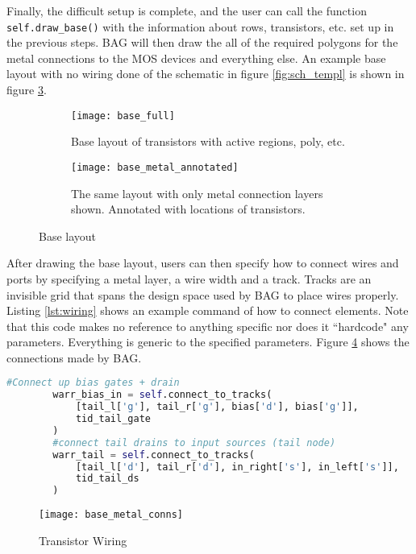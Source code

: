 \clearpage
Finally, the difficult setup is complete, and the user can call the function \texttt{self.draw\_base()} with the information about rows, transistors, etc. set up in the previous steps. BAG will then draw the all of the required polygons for the metal connections to the MOS devices and everything else. An example base layout with no wiring done of the schematic in figure \ref{fig:sch_templ} is shown in figure \ref{fig:base_layout_metal}.
\begin{figure}[h]
\centering
\begin{subfigure}{.4\linewidth}
  \centering
  \texttt{[image: base\_full]}
  \caption{Base layout of transistors with active regions, poly, etc.}
  \label{fig:sfig1}
\end{subfigure}
\begin{subfigure}{.4\linewidth}
  \centering
\texttt{[image: base\_metal\_annotated]}
  \caption{The same layout with only metal connection layers shown. Annotated with locations of transistors.}
  \label{fig:sfig2}
\end{subfigure}
\caption{Base layout}
\label{fig:base_layout_metal}
\end{figure}
\clearpage
After drawing the base layout, users can then specify how to connect wires and ports by specifying a metal layer, a wire width and a track. Tracks are an invisible grid that spans the design space used by BAG to place wires properly. Listing \ref{lst:wiring} shows an example command of how to connect elements. Note that this code makes no reference to anything specific nor does it ``hardcode" any parameters. Everything is generic to the specified parameters. Figure \ref{fig:base_with_wires} shows the connections made by BAG.
\begin{lstlisting}[language=Python, caption=Drawing wire connections, label={lst:wiring}, float]
	#Connect up bias gates + drain
        warr_bias_in = self.connect_to_tracks(
            [tail_l['g'], tail_r['g'], bias['d'], bias['g']],
            tid_tail_gate
        )
        #connect tail drains to input sources (tail node)
        warr_tail = self.connect_to_tracks(
            [tail_l['d'], tail_r['d'], in_right['s'], in_left['s']],
            tid_tail_ds
        )
\end{lstlisting}
\begin{figure}[h]
\centering
\texttt{[image: base\_metal\_conns]}
\caption{Transistor Wiring}
\label{fig:base_with_wires}
\end{figure}


